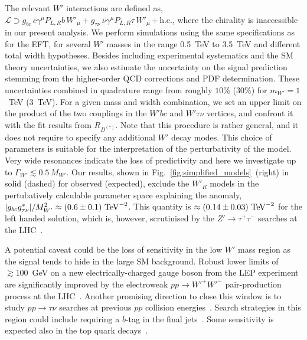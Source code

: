 \documentclass[%
 reprint,
 superscriptaddress,preprintnumbers,
 amsmath,amssymb,
 aps,
]{revtex4-1}
\begin{document}
The relevant $W'$ interactions are defined as, $\mathcal{L} \supset g_{b c}\, \bar c \gamma^\mu P_{L,R}b \, W'_\mu + g_{\tau \nu}\, \bar \nu \gamma^\mu P_{L,R} \tau \, W'_\mu$\,+\,h.c., where the chirality is inaccessible in our present analysis. We perform simulations using the same specifications as for the EFT, for several $W'$ masses in the range 0.5~TeV to 3.5~TeV and different total width hypotheses. Besides including experimental systematics and the SM theory uncertainties, we also estimate the uncertainty on the signal prediction stemming from the higher-order QCD corrections and PDF determination. These uncertainties combined in quadrature range from roughly $10\%$ ($30\%$) for $m_{W'} = 1$~TeV (3~TeV). For a given mass and width combination, we set an upper limit on the product of the two couplings in the $W'bc$ and $W'\tau\nu$ vertices, and confront it with the fit results from $R_{D^{(*)}}$. Note that this procedure is rather general, and it does not require to specify any additional $W'$ decay modes. This choice of parameters is suitable for the interpretation of the perturbativity of the model. Very wide resonances indicate the loss of predictivity and here we investigate up to $\Gamma_{W'} \lesssim 0.5\, M_{W'}$. Our results, shown in Fig.~\ref{fig:simplified_models}~(right) {in solid (dashed) for observed (expected)}, exclude the $W'_R$ models in the pertubatively calculable parameter space explaining the anomaly, $|g_{b c} g^{*}_{\tau \nu}| / M^2_{W'} \approx (0.6\pm0.1)~\rm{TeV}^{-2}$. This quantity is $\approx (0.14\pm0.03)~\rm{TeV}^{-2}$ for the left handed solution, which is, however, scrutinised by the $Z' \to \tau^+ \tau^-$ searches at the LHC~\cite{Faroughy:2016osc}.

A potential caveat could be the loss of sensitivity in the low $W'$ mass region as the signal tends to hide in the large SM background. Robust lower limits of $\gtrsim 100$~GeV on a new electrically-charged gauge boson from the LEP experiment are significantly improved by the electroweak $p p \to W'^+ W'^-$ pair-production process at the LHC~\cite{JAJfuture}. Another promising direction to close this window is to study $p p \to \tau \nu$ searches at previous $p p$ collision energies~\cite{JAJfuture}. Search strategies in this region could include requiring a $b$-tag in the final jets~\cite{Abdullah:2018ets}. Some sensitivity is expected also in the top quark decays~\cite{Kamenik:2018nxv}.



\end{document}

